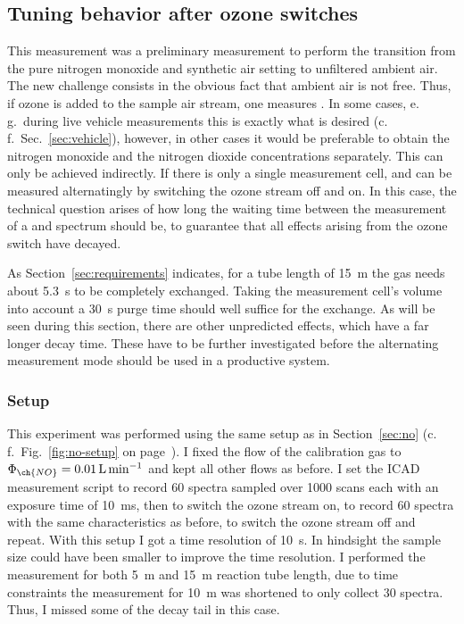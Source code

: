 \subsection{Tuning behavior after ozone switches}
\label{sec:switch}

This measurement was a preliminary measurement to perform the
transition from the pure nitrogen monoxide and synthetic air setting
to unfiltered ambient air. The new challenge consists in the obvious
fact that ambient air is not  free. Thus, if ozone is added to
the sample air stream, one measures . In some
cases, e.\,g.\ during live vehicle measurements this is exactly what
is desired (c.\,f.~Sec.~\ref{sec:vehicle}), however, in other cases it
would be preferable to obtain the nitrogen monoxide and the nitrogen
dioxide concentrations separately. This can only be achieved
indirectly. If there is only a single measurement cell,  and
 can be measured alternatingly by switching the ozone stream
off and on. In this case, the technical question arises of how long
the waiting time between the measurement of a  and 
spectrum should be, to guarantee that all effects arising from the
ozone switch have decayed.

As Section~\ref{sec:requirements} indicates, for a tube length of
\SI{15}{\meter} the gas needs about \SI{5.3}{\second} to be completely
exchanged. Taking the measurement cell's volume into account a
\SI{30}{\second} purge time should well suffice for the exchange. As
will be seen during this section, there are other unpredicted effects,
which have a far longer decay time. These have to be further
investigated before the alternating measurement mode should be used in
a productive system.

\subsubsection{Setup}
\label{sec:switch-setup}

This experiment was performed using the same setup as in
Section~\ref{sec:no} (c.\,f.\ Fig.~\ref{fig:no-setup} on
page~\pageref{fig:no-setup}). I fixed the flow of the 
calibration gas to $\Phi_{\ch{NO}} = \SI{0.01}{\liter\per\minute}$ and
kept all other flows as before. I set the ICAD measurement script to
record 60 spectra sampled over 1000 scans each with an exposure time
of \SI{10}{\milli\second}, then to switch the ozone stream on, to
record 60 spectra with the same characteristics as before, to switch
the ozone stream off and repeat. With this setup I got a time
resolution of \SI{10}{\second}. In hindsight the sample size could
have been smaller to improve the time resolution. I performed the
measurement for both \SI{5}{\meter} and \SI{15}{\meter} reaction tube
length, due to time constraints the measurement for \SI{10}{\meter}
was shortened to only collect 30 spectra. Thus, I missed some of the
decay tail in this case.


